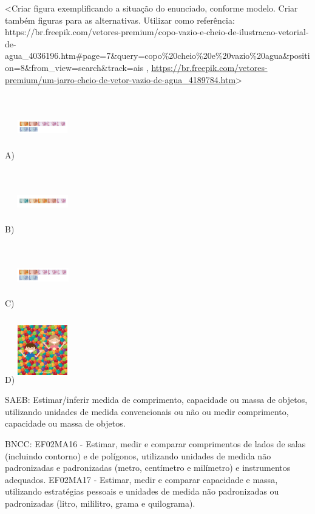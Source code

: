 \begin{escolha}
\begin{escolha}
{{{{{{{{\textless{}Criar figura exemplificando a situação do enunciado, conforme
modelo. Criar também figuras para as alternativas. Utilizar como
referência:
https://br.freepik.com/vetores-premium/copo-vazio-e-cheio-de-ilustracao-vetorial-de-agua\_4036196.htm\#page=7\&query=copo\%20cheio\%20e\%20vazio\%20agua\&position=8\&from\_view=search\&track=ais
,
\url{https://br.freepik.com/vetores-premium/um-jarro-cheio-de-vetor-vazio-de-agua_4189784.htm}\textgreater{}

A)
\includegraphics[width=0.85660in,height=1.10720in]{media/image145.png}

B)
\includegraphics[width=0.87104in,height=1.07664in]{media/image146.png}

C)
\includegraphics[width=0.88672in,height=1.06792in]{media/image145.png}

D)
\includegraphics[width=0.86059in,height=1.12017in]{media/image147.png}

SAEB: Estimar/inferir medida de comprimento, capacidade ou massa
de objetos, utilizando unidades de medida convencionais ou não ou medir
comprimento, capacidade ou massa de objetos.

BNCC: EF02MA16 - Estimar, medir e comparar comprimentos de lados de
salas (incluindo contorno) e de polígonos, utilizando unidades de medida
não padronizadas e padronizadas (metro, centímetro e milímetro) e
instrumentos adequados. EF02MA17 - Estimar, medir e comparar capacidade
e massa, utilizando estratégias pessoais e unidades de medida não
padronizadas ou padronizadas (litro, mililitro, grama e quilograma).

}}}}}}}}
\end{escolha}
\end{escolha}
